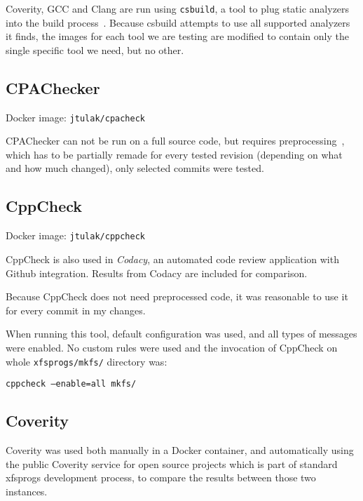 Coverity, GCC and Clang are run using {\tt csbuild}, a tool to plug static
analyzers into the build process~\cite{csbuildMan}. Because csbuild attempts to
use all supported analyzers it finds, the images for each tool we are testing
are modified to contain only the single specific tool we need, but no other.
\subsection{CPAChecker}
Docker image: {\tt jtulak/cpacheck}~\cite{dockerCPAChecker}

CPAChecker can not be run on a full source code, but requires
preprocessing~\cite{cpacheckerGettingStarted}, which has to be partially
remade for every tested revision (depending on what and how much changed),
       only selected commits were tested.
\subsection{CppCheck}
Docker image: {\tt jtulak/cppcheck}~\cite{dockerCPPCheck}

CppCheck is also used in {\em Codacy}, an automated code review application
with Github integration. Results from Codacy are included for comparison.

Because CppCheck does not need preprocessed code, it was reasonable to use
it for every commit in my changes.

When running this tool, default configuration was used, and all types of
messages were enabled. No custom rules were used and the invocation of
CppCheck on whole {\tt xfsprogs/mkfs/} directory was:

{\tt cppcheck --enable=all mkfs/}



\subsection{Coverity}
Coverity was used both manually in a Docker container, and automatically
using the public Coverity service for open source projects which is part
of standard xfsprogs development process, to compare the results between
those two instances.

